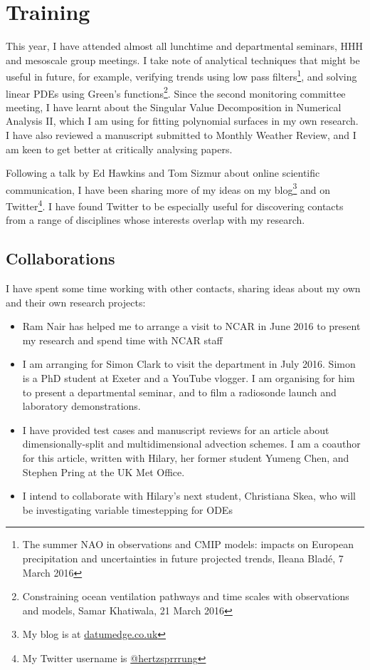 \documentclass[a4paper,11pt]{article}
\begin{document}
\section{Training}
This year, I have attended almost all lunchtime and departmental seminars, HHH and mesoscale group meetings.  I take note of analytical techniques that might be useful in future, for example, verifying trends using low pass filters\footnote{The summer NAO in observations and CMIP models: impacts on European precipitation and uncertainties in future projected trends, Ileana Bladé, 7 March 2016}, and solving linear PDEs using Green's functions\footnote{Constraining ocean ventilation pathways and time scales with observations and models, Samar Khatiwala, 21 March 2016}.
Since the second monitoring committee meeting, I have learnt about the Singular Value Decomposition in Numerical Analysis II, which I am using for fitting polynomial surfaces in my own research.
I have also reviewed a manuscript submitted to Monthly Weather Review, and I am keen to get better at critically analysing papers.

Following a talk by Ed Hawkins and Tom Sizmur about online scientific communication, I have been sharing more of my ideas on my blog\footnote{My blog is at \url{datumedge.co.uk}} and on Twitter\footnote{My Twitter username is \href{https://twitter.com/hertzsprrrung}{@hertzsprrrung}}.  I have found Twitter to be especially useful for discovering contacts from a range of disciplines whose interests overlap with my research.

\subsection*{Collaborations}
I have spent some time working with other contacts, sharing ideas about my own and their own research projects:
\begin{itemize}
\item Ram Nair has helped me to arrange a visit to NCAR in June 2016 to present my research and spend time with NCAR staff
\item I am arranging for Simon Clark to visit the department in July 2016.  Simon is a PhD student at Exeter and a YouTube vlogger.  I am organising for him to present a departmental seminar, and to film a radiosonde launch and laboratory demonstrations.
\item I have provided test cases and manuscript reviews for an article about dimensionally-split and multidimensional advection schemes.  I am a coauthor for this article, written with Hilary, her former student Yumeng Chen, and Stephen Pring at the UK Met Office.
\item I intend to collaborate with Hilary's next student, Christiana Skea, who will be investigating variable timestepping for ODEs
\end{itemize}
\end{document}
